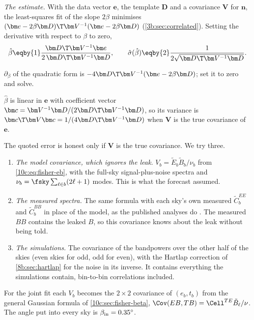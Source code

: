 \emph{The estimate.} With the data vector $\bm e$, the template $\bm D$ and a covariance $\bm V$ for $\bm n$, the
least-squares fit of the slope $2\beta$ minimises $(\bm e-2\beta\bm D)\T\bm V^{-1}(\bm e-2\beta\bm D)$ (\cref{3b:sec:correlated}).
Setting the derivative with respect to $\beta$ to zero,
\begin{equation}
  \hat\beta\eqby{1}\frac{\bm D\T\bm V^{-1}\bm e}{2\,\bm D\T\bm V^{-1}\bm D},\qquad
  \hat\sigma(\hat\beta)\eqby{2}\frac{1}{2\sqrt{\bm D\T\bm V^{-1}\bm D}} .
  \label{10c:eq:mc-betahat}
\end{equation}
\begin{explain}
  \item $\partial_\beta$ of the quadratic form is $-4\bm D\T\bm V^{-1}(\bm e-2\beta\bm D)$; set it to zero and solve.
  \item $\hat\beta$ is linear in $\bm e$ with coefficient vector $\bm c=\bm V^{-1}\bm D/(2\bm D\T\bm V^{-1}\bm D)$, so its variance is
        $\bm c\T\bm V\bm c=1/(4\bm D\T\bm V^{-1}\bm D)$ when $\bm V$ is the true covariance of $\bm e$.
\end{explain}
The quoted error is honest only if $\bm V$ is the true covariance. We try three.
\begin{enumerate}[label=(\alph*),leftmargin=2em,itemsep=2pt]
  \item \emph{The model covariance, which ignores the leak.} $V_b=\tilde E_b\tilde B_b/\nu_b$ from \eqref{10c:eq:fisher-eb},
        with the full-sky signal-plus-noise spectra and $\nu_b=\fsky\sum_{\ell\in b}(2\ell+1)$ modes. This is what the
        forecast assumed.
  \item \emph{The measured spectra.} The same formula with each sky's own measured $\widetilde C^{EE}_b$ and $\widetilde C^{BB}_b$
        in place of the model, as the published analyses do \cite{MinamiKomatsu2020,EskiltKomatsu2022}. The measured
        $BB$ contains the leaked $B$, so this covariance knows about the leak without being told.
  \item \emph{The simulations.} The covariance of the bandpowers over the other half of the skies (even skies for odd,
        odd for even), with the Hartlap correction of \cref{8b:sec:hartlap} for the noise in its inverse. It contains
        everything the simulations contain, bin-to-bin correlations included.
\end{enumerate}
For the joint fit each $V_b$ becomes the $2\times2$ covariance of $(e_b,t_b)$ from the general Gaussian formula of
\cref{10c:sec:fisher-beta}, $\Cov(EB,TB)=\Cell^{TE}\tilde B_\ell/\nu$. The angle put into every sky is $\beta_{\rm in}=0.35^\circ$.

